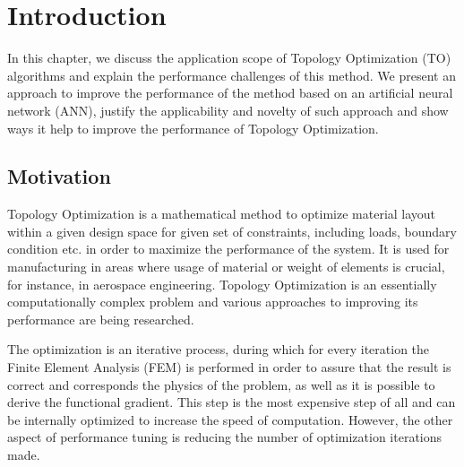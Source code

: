 
\chapter{Introduction}
\label{chapter:Introduction}

In this chapter, we discuss the application scope of Topology Optimization (TO) algorithms and explain the performance challenges of this method.
We present an approach to improve the performance of the method based on an artificial neural network (ANN), justify the applicability and novelty of such approach and show ways it help to improve the performance of Topology Optimization. 



\section{Motivation}

Topology Optimization is a mathematical method to optimize material layout within a given design space for given set of constraints, including loads, boundary condition etc. in order to maximize the performance of the system.
It is used for manufacturing in areas where usage of material or weight of elements is crucial, for instance, in aerospace engineering\cite{}.
Topology Optimization is an essentially computationally complex problem and various approaches to improving its performance are being researched.
\medskip

The optimization is an iterative process, during which for every iteration the Finite Element Analysis (FEM) is performed in order to assure that the result is correct and corresponds the physics of the problem, as well as it is possible to derive the functional gradient.
This step is the most expensive step of all and can be internally optimized to increase the speed of computation.
However, the other aspect of performance tuning is reducing the number of optimization iterations made.
\medskip


